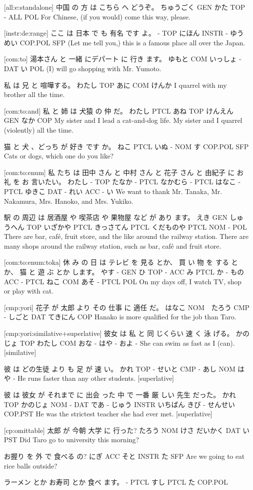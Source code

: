 [all:e:standalone]
中国      の  方    は こちら へ どうぞ。
ちゅうごく GEN かた TOP -    ALL POL
For Chinese, (if you would) come this way, please.

[instr:de:range]
ここ は  日本    で   も  有名    です   よ。
-   TOP にほん INSTR - ゆうめい COP.POL SFP
(Let me tell you,) this is a famous place all over the Japan.

[com:to]
湯本さん と  一緒 にデパート に 行き ます。
ゆもと  COM いっしょ -    DAT い  POL
(I) will go shopping with Mr. Yumoto.

私     は  兄  と  喧嘩する。
わたし TOP あに COM けんか
I quarrel with my brother all the time.

[com:to:and]
私     と   姉   は   犬猿   の  仲   だ。
わたし PTCL あね TOP けんえん GEN なか COP
My sister and I lead a cat-and-dog life.
My sister and I quarrel (violently) all the time.

猫    と  犬 、どっち が 好き です    か。
ねこ PTCL いぬ -     NOM す COP.POL SFP
Cats or dogs, which one do you like?

[com:to:enum]
私 たち  は  田中 さん と   中村 さん  と    花子 さん と  由紀子 に  お 礼   を お 言いたい。
わたし - TOP たなか - PTCL なかむら - PTCL はなこ - PTCL ゆきこ DAT - れい ACC - い
We want to thank Mr. Tanaka, Mr. Nakamura, Mrs. Hanoko, and Mrs. Yukiko.

駅   の  周辺       は 居酒屋    や    喫茶店   や     果物屋  など  が  あり ます。
えき GEN しゅうへん TOP いざかや PTCL きっさてん PTCL くだものや PTCL NOM -   POL
There are bar, café, fruit store, and the like around the railway station.
There are many shops around the railway station, such as bar, café and fruit store.

[com:to:enum:toka]
休  み の  日  は テレビ を 見る とか、 買 い 物  を する とか、 猫  と  遊  ぶ とか します。
やす - GEN ひ TOP -   ACC み  PTCL  か - もの ACC -  PTCL ねこ COM あそ - PTCL POL
On my days off, I watch TV, shop or play with cat.

[cmp:yori]
花子   が   太郎 より その 仕事  に  適任    だ。
はなこ NOM　たろう CMP - しごと DAT てきにん COP
Hanako is more qualified for the job than Taro.

[cmp:yori:similative+superlative]
彼女     は   私    と 同 じくらい 速  く 泳 げる。
かのじょ TOP わたし COM おな -    はや - およ -
She can swim as fast as I (can). [similative]

彼   は どの生徒  より も 足   が  速 い。
かれ TOP - せいと CMP - あし NOM はや -
He runs faster than any other students. [superlative]

彼   は   彼女    が それまで に 出会 った 中    で   一番    厳 しい 先生    だった。
かれ TOP かのじょ NOM -     DAT であ - じゅう INSTR いちばん きび - せんせい COP.PST
He was the strictest teacher she had ever met. [superlative]

[cp:omittable]
太郎   が  今朝 大学    に   行った?
たろう NOM けさ だいかく DAT い PST
Did Taro go to university this morning?

お握り を   外  で      食べる の?
にぎ  ACC そと INSTR  た SFP
Are we going to eat rice balls outside?

ラーメン とか お寿司 とか 食べ ます。
-      PTCL すし  PTCL た COP.POL
